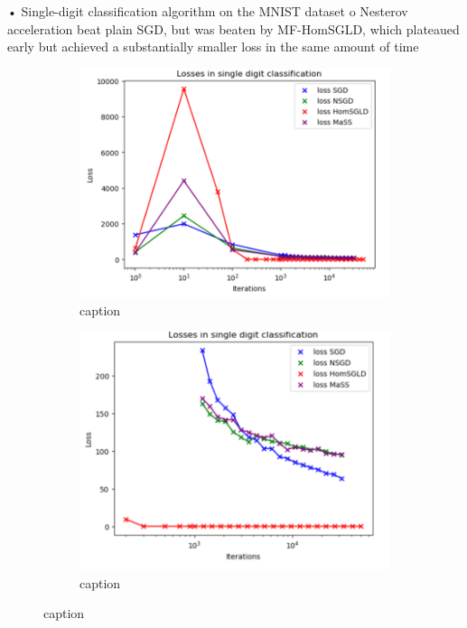 \documentclass{article}
\begin{document}
•	Single-digit classification algorithm on the MNIST dataset
o	Nesterov acceleration beat plain SGD, but was beaten by MF-HomSGLD, which plateaued early but achieved a substantially smaller loss in the same amount of time
     \begin{figure}[H]
 \begin{subfigure}{0.5\textwidth}
   \centering
   \includegraphics[width=0.8\linewidth]{images/Spiliopoulos2019-SGD-algos-single-digit classification.png}
   \caption{ caption}
   \label{fig: description}
 \end{subfigure}%
 \begin{subfigure}{0.5\textwidth}
   \centering
   \includegraphics[width=0.8\linewidth]{images/Spiliopoulos2019-SGD-algos-single-digit-late-time.png}
   \caption{ caption}
   \label{fig:  description}
 \end{subfigure}
 \caption{ caption}
 \label{fig:  label}
 \end{figure} 
 
\end{document}
